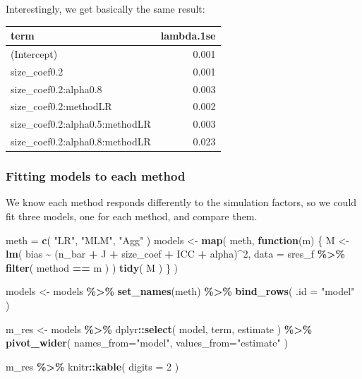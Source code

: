 \documentclass[
]{book}
\newenvironment{Shaded}{\begin{snugshade}}{\end{snugshade}}
\newcommand{\AttributeTok}[1]{\textcolor[rgb]{0.13,0.29,0.53}{#1}}
\newcommand{\ControlFlowTok}[1]{\textcolor[rgb]{0.13,0.29,0.53}{\textbf{#1}}}
\newcommand{\DecValTok}[1]{\textcolor[rgb]{0.00,0.00,0.81}{#1}}
\newcommand{\FunctionTok}[1]{\textcolor[rgb]{0.13,0.29,0.53}{\textbf{#1}}}
\newcommand{\NormalTok}[1]{#1}
\newcommand{\OtherTok}[1]{\textcolor[rgb]{0.56,0.35,0.01}{#1}}
\newcommand{\SpecialCharTok}[1]{\textcolor[rgb]{0.81,0.36,0.00}{\textbf{#1}}}
\newcommand{\StringTok}[1]{\textcolor[rgb]{0.31,0.60,0.02}{#1}}
\begin{document}
Interestingly, we get basically the same result:

\begin{tabular}{l|r}
\hline
term & lambda.1se\\
\hline
(Intercept) & 0.001\\
\hline
size\_coef0.2 & 0.001\\
\hline
size\_coef0.2:alpha0.8 & 0.003\\
\hline
size\_coef0.2:methodLR & 0.002\\
\hline
size\_coef0.2:alpha0.5:methodLR & 0.003\\
\hline
size\_coef0.2:alpha0.8:methodLR & 0.023\\
\hline
\end{tabular}

\subsubsection{Fitting models to each method}\label{fitting-models-to-each-method}

We know each method responds differently to the simulation factors, so we could fit three models, one for each method, and compare them.

\begin{Shaded}
\begin{Highlighting}[]
\NormalTok{meth }\OtherTok{=} \FunctionTok{c}\NormalTok{( }\StringTok{"LR"}\NormalTok{, }\StringTok{"MLM"}\NormalTok{, }\StringTok{"Agg"}\NormalTok{ )}
\NormalTok{models }\OtherTok{\textless{}{-}} \FunctionTok{map}\NormalTok{( meth, }\ControlFlowTok{function}\NormalTok{(m) \{}
\NormalTok{  M }\OtherTok{\textless{}{-}} \FunctionTok{lm}\NormalTok{( bias }\SpecialCharTok{\textasciitilde{}}\NormalTok{ (n\_bar }\SpecialCharTok{+}\NormalTok{ J }\SpecialCharTok{+}\NormalTok{ size\_coef }\SpecialCharTok{+}\NormalTok{ ICC }\SpecialCharTok{+}\NormalTok{ alpha)}\SpecialCharTok{\^{}}\DecValTok{2}\NormalTok{, }
      \AttributeTok{data =}\NormalTok{ sres\_f }\SpecialCharTok{\%\textgreater{}\%} \FunctionTok{filter}\NormalTok{( method }\SpecialCharTok{==}\NormalTok{ m ) )}
  \FunctionTok{tidy}\NormalTok{( M )}
\NormalTok{\} )}

\NormalTok{models }\OtherTok{\textless{}{-}} 
\NormalTok{  models }\SpecialCharTok{\%\textgreater{}\%} 
  \FunctionTok{set\_names}\NormalTok{(meth) }\SpecialCharTok{\%\textgreater{}\%} 
  \FunctionTok{bind\_rows}\NormalTok{( }\AttributeTok{.id =} \StringTok{"model"}\NormalTok{ )}

\NormalTok{m\_res }\OtherTok{\textless{}{-}}\NormalTok{ models }\SpecialCharTok{\%\textgreater{}\%} 
\NormalTok{  dplyr}\SpecialCharTok{::}\FunctionTok{select}\NormalTok{( model, term, estimate ) }\SpecialCharTok{\%\textgreater{}\%}
  \FunctionTok{pivot\_wider}\NormalTok{( }\AttributeTok{names\_from=}\StringTok{"model"}\NormalTok{, }\AttributeTok{values\_from=}\StringTok{"estimate"}\NormalTok{ )}

\NormalTok{m\_res }\SpecialCharTok{\%\textgreater{}\%}
\NormalTok{  knitr}\SpecialCharTok{::}\FunctionTok{kable}\NormalTok{( }\AttributeTok{digits =} \DecValTok{2}\NormalTok{ )}
\end{Highlighting}
\end{Shaded}
\end{document}
